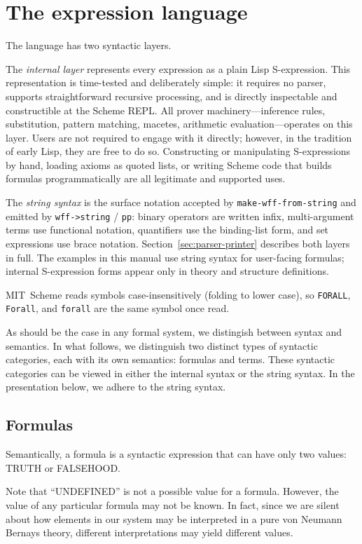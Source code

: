 \chapter{The expression language}
\label{sec:language}


The language has two syntactic layers.

The \emph{internal layer} represents every expression as a plain
Lisp S-expression.  This representation is time-tested and deliberately
simple: it requires no parser, supports straightforward recursive
processing, and is directly inspectable and constructible at the Scheme
REPL.  All prover machinery---inference rules, substitution, pattern
matching, macetes, arithmetic evaluation---operates on this layer.
Users are not required to engage with it directly; however, in the
tradition of early Lisp, they are free to do so.  Constructing or
manipulating S-expressions by hand, loading axioms as quoted lists,
or writing Scheme code that builds formulas programmatically are all
legitimate and supported uses.

The \emph{string syntax} is the surface notation accepted by
\texttt{make-wff-from-string} and emitted by \texttt{wff->string}
/ \texttt{pp}: binary operators are written infix, multi-argument
terms use functional notation, quantifiers use the binding-list form,
and set expressions use brace notation.
Section~\ref{sec:parser-printer} describes both layers in full.
The examples in this manual use string syntax for user-facing
formulas; internal S-expression forms appear only in theory and
structure definitions.

MIT~Scheme reads symbols case-insensitively (folding to lower case),
so \texttt{FORALL}, \texttt{Forall}, and \texttt{forall} are the same
symbol once read.

As should be the case in any formal system, we distingish between
syntax and semantics. In what follows, we distinguish two distinct
types of syntactic categories, each with its own semantics: formulas
and terms. These syntactic categories can be viewed in either the
internal syntax or the string syntax. In the presentation below, we
adhere to the string syntax.


\section{Formulas}

Semantically, a formula is a syntactic expression that can have only
two values: TRUTH or FALSEHOOD. 
%
\begin{remark}\label{remark:27137-52766-301830}
%
Note that ``UNDEFINED'' is not a possible value for a
formula. However, the value of any particular formula may not be
known. In fact, since we are silent about how elements in our system
may be interpreted in a pure von Neumann Bernays theory, different
interpretations may yield different values.
%
\end{remark}

